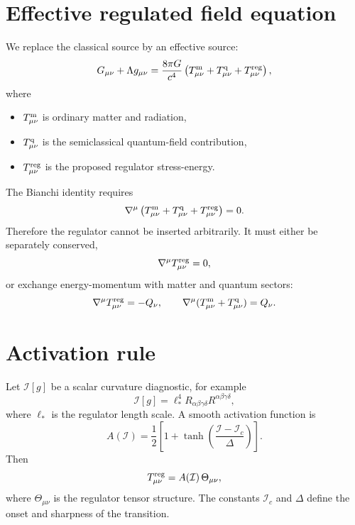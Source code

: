 \documentclass[11pt]{article}
\theoremstyle{remark}
\begin{document}
\section{Effective regulated field equation}
We replace the classical source by an effective source:
\begin{equation}
    G_{\mu\nu} + \Lambda g_{\mu\nu}
    = \frac{8\pi G}{c^4}
    \left(
        T^{\rm m}_{\mu\nu}
        + T^{\rm q}_{\mu\nu}
        + T^{\rm reg}_{\mu\nu}
    \right),
    \label{eq:modified-einstein}
\end{equation}
where
\begin{itemize}[leftmargin=2em]
    \item $T^{\rm m}_{\mu\nu}$ is ordinary matter and radiation,
    \item $T^{\rm q}_{\mu\nu}$ is the semiclassical quantum-field contribution,
    \item $T^{\rm reg}_{\mu\nu}$ is the proposed regulator stress-energy.
\end{itemize}

The Bianchi identity requires
\begin{equation}
    \nabla^\mu
    \left(
        T^{\rm m}_{\mu\nu}
        + T^{\rm q}_{\mu\nu}
        + T^{\rm reg}_{\mu\nu}
    \right)=0.
    \label{eq:conservation}
\end{equation}
Therefore the regulator cannot be inserted arbitrarily. It must either be separately conserved,
\begin{equation}
    \nabla^\mu T^{\rm reg}_{\mu\nu}=0,
\end{equation}
or exchange energy-momentum with matter and quantum sectors:
\begin{equation}
    \nabla^\mu T^{\rm reg}_{\mu\nu}=-Q_\nu,
    \qquad
    \nabla^\mu(T^{\rm m}_{\mu\nu}+T^{\rm q}_{\mu\nu})=Q_\nu.
\end{equation}

\section{Activation rule}
Let $\mathcal I[g]$ be a scalar curvature diagnostic, for example
\begin{equation}
    \mathcal I[g]
    = \ell_*^4 R_{\alpha\beta\gamma\delta}R^{\alpha\beta\gamma\delta},
\end{equation}
where $\ell_*$ is the regulator length scale. A smooth activation function is
\begin{equation}
    A(\mathcal I)=\frac{1}{2}\left[1+\tanh\left(\frac{\mathcal I-\mathcal I_c}{\Delta}\right)\right].
\end{equation}
Then
\begin{equation}
    T^{\rm reg}_{\mu\nu}=A(\mathcal I)\,\Theta_{\mu\nu},
\end{equation}
where $\Theta_{\mu\nu}$ is the regulator tensor structure. The constants $\mathcal I_c$ and $\Delta$ define the onset and sharpness of the transition.
\end{document}
